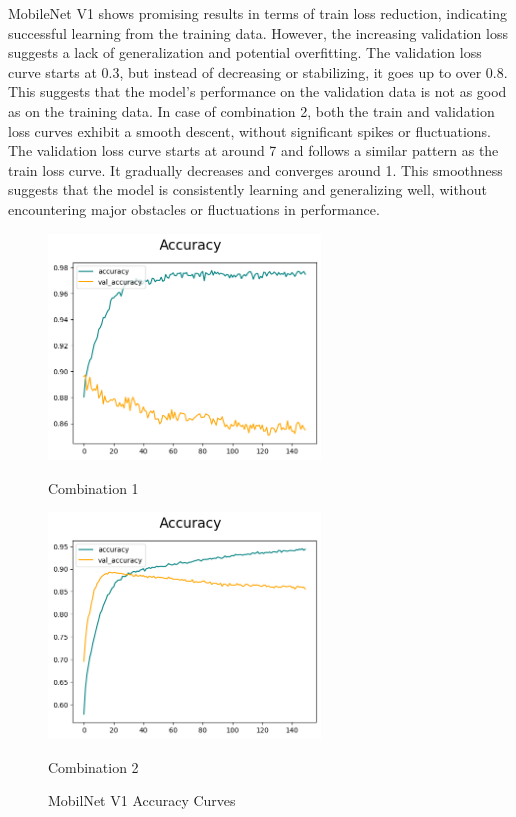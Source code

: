 MobileNet V1 shows promising results in terms of train loss reduction, indicating successful learning from the training data. However, the increasing validation loss suggests a lack of generalization and potential overfitting. The validation loss curve starts at 0.3, but instead of decreasing or stabilizing, it goes up to over 0.8. This suggests that the model's performance on the validation data is not as good as on the training data. In case of combination 2, both the train and validation loss curves exhibit a smooth descent, without significant spikes or fluctuations. The validation loss curve starts at around 7 and follows a similar pattern as the train loss curve. It gradually decreases and converges around 1. This smoothness suggests that the model is consistently learning and generalizing well, without encountering major obstacles or fluctuations in performance.

\begin{figure}[H]
    \centering
    \begin{minipage}[b]{0.49\textwidth}
        \centering
        \includegraphics[width=\textwidth, height=6cm]{Figures/unbalanced_data/without bn/mn1/accuracy.png}
        \captionsetup{labelformat=empty}
        \caption{Combination 1}
        \label{fig:u_wo_r_a}
    \end{minipage}
    \hfill
    \begin{minipage}[b]{0.49\textwidth}
        \centering
        \includegraphics[width=\textwidth, height=6cm]{Figures/unbalanced_data/with bn/mn1/accuracy.png}
        \captionsetup{labelformat=empty}
        \caption{Combination 2}
        \label{fig:u_w_r_a}
    \end{minipage}
    \captionsetup{labelformat=default}
    \caption{MobilNet V1 Accuracy Curves}
\end{figure}

